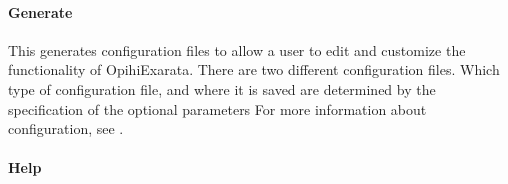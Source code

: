 \documentclass[letterpaper,11pt,english]{sphinxmanual}
\begin{document}
\paragraph{Generate}
\label{\detokenize{user/command_line:generate}}\label{\detokenize{user/command_line:user-command-line-available-actions-generate}}

\begin{savenotes}\begin{fulllineitems}
\label{\detokenize{user/command_line:cmdoption-arg-generate}}
\pysigstartsignatures
{}
\pysigstopsignatures
\end{fulllineitems}\end{savenotes}


\sphinxAtStartPar
This generates configuration files to allow a user to edit and customize the
functionality of OpihiExarata. There are two different configuration files.
Which type of configuration file, and where it is saved are determined by the
specification of the optional parameters
For more information about configuration, see {\hyperref[\detokenize{user/configuration:user-configuration}]{}}.


\paragraph{Help}
\label{\detokenize{user/command_line:help}}\label{\detokenize{user/command_line:user-command-line-available-actions-help}}

\begin{savenotes}\begin{fulllineitems}
\label{\detokenize{user/command_line:cmdoption-arg-help}}
\pysigstartsignatures
{}
\pysigstopsignatures
\end{fulllineitems}\end{savenotes}
\end{document}

